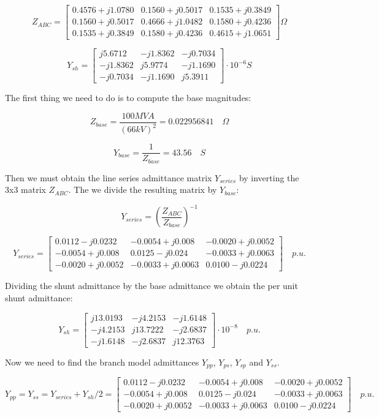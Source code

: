 \documentclass{tufte-book}
\begin{document}
$$
Z_{ABC} = \left[ \begin{array}{ccc}
0.4576 + j 1.0780 & 0.1560 + j0 .5017 & 0.1535 + j 0.3849 \\
0.1560 + j 0.5017 & 0.4666 + j 1.0482 & 0.1580 + j 0.4236 \\ 
0.1535 + j 0.3849 & 0.1580 + j 0.4236 & 0.4615 + j 1.0651
\end{array} \right] \Omega
$$

$$
Y_{sh} = \left[ \begin{array}{ccc}
j5.6712 & -j1.8362 & -j0.7034 \\
-j1.8362 & j5.9774 & -j1.1690 \\ 
-j0.7034 & -j1.1690 & j5.3911
\end{array} \right] \cdot 10^{-6}  S
$$

The first thing we need to do is to compute the base magnitudes:

$$
Z_{base} = \frac{100 MVA}{(66kV)^2} = 0.022956841 \quad \Omega
$$

$$
Y_{base} = \frac{1}{Z_{base}} = 43.56 \quad S
$$

Then we must obtain the line series admittance matrix $Y_{series}$ by inverting the 3x3 matrix $Z_{ABC}$. The we divide the resulting matrix by $Y_{base}$:

$$
Y_{series} = \left(\frac{Z_{ABC}}{Z_{base}}\right)^{-1}
$$

$$
Y_{series} = \left[ \begin{array}{ccc}
0.0112-j0.0232  & -0.0054+j0.008   & -0.0020+j0.0052 \\ -0.0054+j0.008  &  0.0125-j0.024 & -0.0033+j0.0063 \\ -0.0020+j0.0052 &  -0.0033+j0.0063 & 0.0100-j0.0224
\end{array} \right]\quad  p.u.
$$

Dividing the shunt admittance by the base admittance we obtain the per unit shunt admittance:

$$
Y_{sh} = \left[ \begin{array}{ccc}
j13.0193 & -j4.2153 &  -j1.6148 \\
-j4.2153 & j13.7222 & -j2.6837 \\ 
-j1.6148 & -j2.6837 & j12.3763
\end{array} \right] \cdot 10^{-8}  \quad p.u.
$$

Now we need to find the branch model admittances $Y_{pp}$, $Y_{ps}$, $Y_{sp}$ and $Y_{ss}$.

$$
Y_{pp} = Y_{ss} = Y_{series} + Y_{sh}/2 = \left[ \begin{array}{ccc}
0.0112-j0.0232  & -0.0054+j0.008   & -0.0020+j0.0052 \\ -0.0054+j0.008  &  0.0125-j0.024 & -0.0033+j0.0063 \\ -0.0020+j0.0052 &  -0.0033+j0.0063 & 0.0100-j0.0224
\end{array} \right]\quad  p.u.
$$
\end{document}
